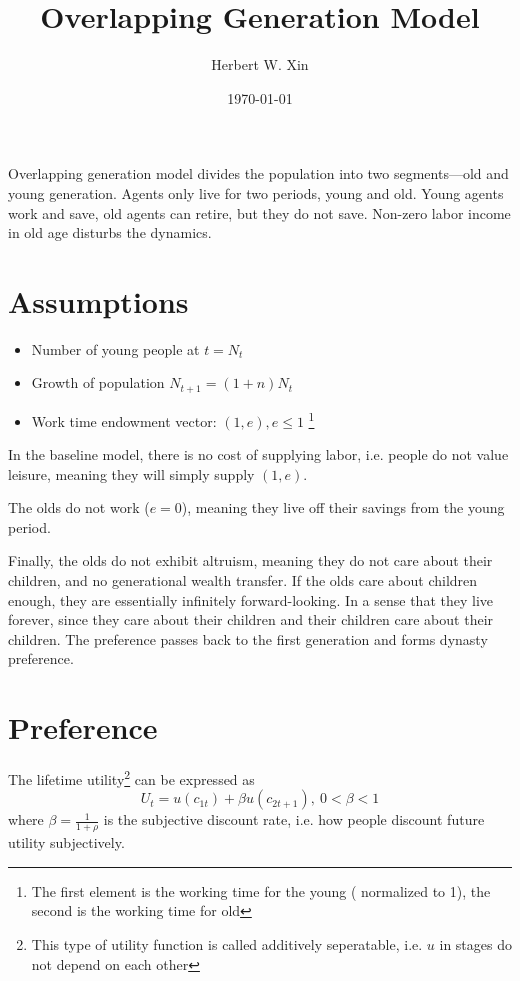 \documentclass[twocolumn, fleqn]{article}
\begin{document}
	\title{Overlapping Generation Model}
	\author{Herbert W. Xin}
	\date{\today}
	\maketitle

	\tableofcontents
	\thispagestyle{fancy}

	\vspace{0.5cm}
	\hline
	\vspace{0.2cm}
	Overlapping generation model divides the population into two segments—old and young generation.
	Agents only live for two periods, young and old.
	Young agents work and save, old agents can retire, but they do not save.
	Non-zero labor income in old age disturbs the dynamics.

	\section{Assumptions}\label{sec:assumptions}
		\begin{itemize}
			\item Number of young people at $t = N_t$
			\item Growth of population $N_{t+1} = (1+n)N_t$
			\item Work time endowment vector: $(1,e), e \leq 1$
			\footnote{The first element is the working time for the young (
				normalized to 1), the second is the working time for old}
		\end{itemize}

		In the baseline model, there is no cost of supplying labor, i.e. people do not value leisure, meaning they
		will simply supply $(1,e)$.

		The olds do not work ($e=0$), meaning they live off their savings from the young period.

		Finally, the olds do not exhibit altruism, meaning they do not care about their children, and no
		generational wealth transfer.
		If the olds care about children enough, they are essentially infinitely forward-looking.
		In a sense that they live forever, since they care about their children and their children care about their
		children.
		The preference passes back to the first generation and forms dynasty preference.

	\section{Preference}\label{sec:preference}
		The lifetime utility\footnote{This type of utility function is called additively seperatable, i.e. $u$ in stages do not depend on each other} can be expressed as
		\begin{equation}
			U_t = u(c_{1t})+\beta u(c_{2t+1}), \ 0<\beta<1\label{eq:preference}
		\end{equation}
		where $\beta = \frac{1}{1+\rho}$ is the subjective discount rate, i.e. how people discount future utility
		subjectively.
\end{document}
